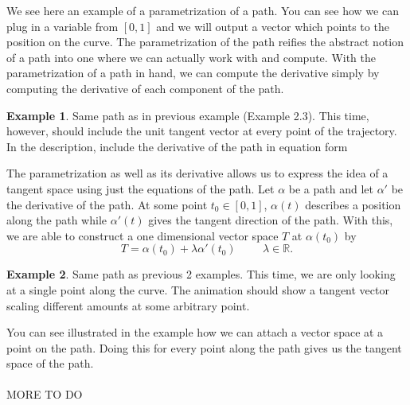 \documentclass[]{article}
\newcommand\<{\ensuremath{\left\langle}}
\renewcommand\>{\ensuremath{\right\rangle}}
\newcommand{\RR}{\ensuremath{\mathbb{R}}}
\theoremstyle{definition}
\theoremstyle{definition}
\newtheorem{example}{Example}[section]
\begin{document}
	We see here an example of a parametrization of a path. You can see how we can plug in a variable from $[0, 1]$ and we will output a vector which points to the position on the curve. The parametrization of the path reifies the abstract notion of a path into one where we can actually work with and compute. With the parametrization of a path in hand, we can compute the derivative simply by computing the derivative of each component of the path. 
	\\
	\begin{example}
		Same path as in previous example (Example 2.3). This time, however, should include the unit tangent vector at every point of the trajectory. In the description, include the derivative of the path in equation form
	\end{example}
	The parametrization as well as its derivative allows us to express the idea of a tangent space using just the equations of the path. Let $\alpha$ be a path and let $\alpha'$ be the derivative of the path. At some point $t_0 \in [0,1]$, $\alpha(t)$ describes a position along the path while $\alpha'(t)$ gives the tangent direction of the path. With this, we are able to construct a one dimensional vector space $T$ at $\alpha(t_0)$ by
	$$
		T = \alpha(t_0) + \lambda\alpha'(t_0) \hspace{1cm} \lambda \in \RR.
	$$
	\begin{example}
		Same path as previous 2 examples. This time, we are only looking at a single point along the curve. The animation should show a tangent vector scaling different amounts at some arbitrary point.
	\end{example}
	You can see illustrated in the example how we can attach a vector space at a point on the path. Doing this for every point along the path gives us the tangent space of the path.\\
	\\
	MORE TO DO
	
	
\end{document}
